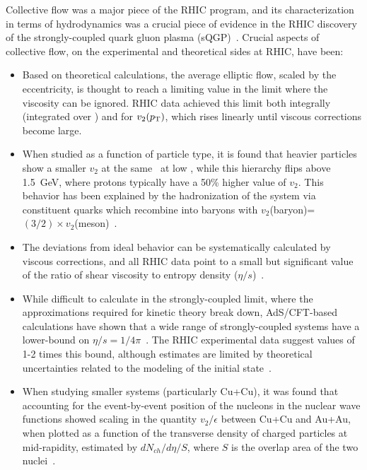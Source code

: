 Collective flow was a major piece of the RHIC program, and its characterization
in terms of hydrodynamics was a crucial piece of evidence in the RHIC discovery
of the strongly-coupled quark gluon plasma (sQGP)~\cite{Back:2004je,Adcox:2004mh,Adams:2005dq,Arsene:2004fa}.
Crucial aspects of collective
flow, on the experimental and theoretical sides at RHIC, have been:
\begin{itemize}
\item Based on theoretical calculations, the average elliptic flow, scaled by the eccentricity,
is thought to reach a limiting value in the limit where
the viscosity can be ignored.  RHIC data achieved this limit both integrally (integrated over \pT)
and for $v_2(\mbox{$p_{\mathrm{T}}$})$, which rises linearly until viscous corrections become large.
\item When studied as a function of particle type, it is found that heavier particles show
a smaller $v_2$ at the same \pT\ at low \pT, while this hierarchy flips above 1.5~GeV, where protons
typically have a 50\% higher value of $v_2$.  This behavior has been explained by the hadronization of
the system via constituent quarks which recombine into baryons with $v_2$(baryon)=$(3/2) \times v_2$(meson)~\cite{Adare:2006ti,Fries:2003vb}.
\item The deviations from ideal behavior can be systematically calculated by viscous corrections, and
all RHIC data point to a small but significant value of the ratio of shear viscosity to entropy density ($\eta/s$)~\cite{Luzum:2008cw}.
\item While difficult to calculate in the strongly-coupled limit, where the approximations required for kinetic theory break down, AdS/CFT-based calculations have shown that a wide range of strongly-coupled systems have a lower-bound on
$\eta/s = 1/4\pi$~\cite{Kovtun:2004de}.  The RHIC experimental data suggest values of 1-2 times this bound, although estimates are limited
by theoretical uncertainties related to the modeling of the initial state~\cite{Luzum:2008cw}.
\item When studying smaller systems (particularly Cu+Cu), it was found that accounting for the event-by-event position of the nucleons in the nuclear wave functions showed scaling in the quantity $v_2/\epsilon$ between Cu+Cu and Au+Au, when
plotted as a function of the transverse density of charged particles at mid-rapidity, estimated by $dN_{ch}/d\eta/S$,
where $S$ is the overlap area of the two nuclei~\cite{Alver:2008zza}.
\end{itemize}

